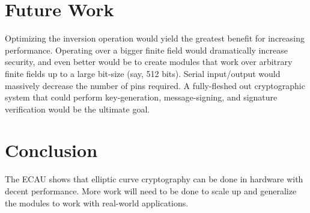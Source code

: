 \documentclass{IEEEtran}
\begin{document}
\section{Future Work}
Optimizing the inversion operation would yield the greatest benefit for increasing performance. Operating over a bigger finite field would dramatically increase security, and even better would be to create modules that work over arbitrary finite fields up to a large bit-size (say, 512 bits). Serial input/output would massively decrease the number of pins required. A fully-fleshed out cryptographic system that could perform key-generation, message-signing, and signature verification would be the ultimate goal. 

\section{Conclusion}
The ECAU shows that elliptic curve cryptography can be done in hardware with decent performance. More work will need to be done to scale up and generalize the modules to work with real-world applications. 



\end{document}
